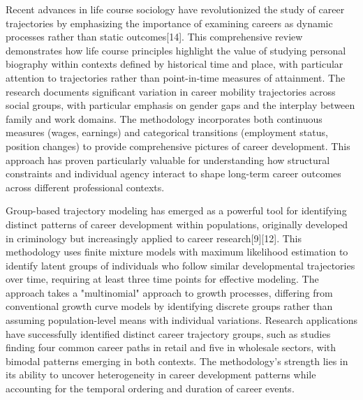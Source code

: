 \documentclass[main.tex]{subfiles}
\begin{document}

Recent advances in life course sociology have revolutionized the study of career trajectories by emphasizing the importance of examining careers as dynamic processes rather than static outcomes[14]. This comprehensive review demonstrates how life course principles highlight the value of studying personal biography within contexts defined by historical time and place, with particular attention to trajectories rather than point-in-time measures of attainment. The research documents significant variation in career mobility trajectories across social groups, with particular emphasis on gender gaps and the interplay between family and work domains. The methodology incorporates both continuous measures (wages, earnings) and categorical transitions (employment status, position changes) to provide comprehensive pictures of career development. This approach has proven particularly valuable for understanding how structural constraints and individual agency interact to shape long-term career outcomes across different professional contexts.


Group-based trajectory modeling has emerged as a powerful tool for identifying distinct patterns of career development within populations, originally developed in criminology but increasingly applied to career research[9][12]. This methodology uses finite mixture models with maximum likelihood estimation to identify latent groups of individuals who follow similar developmental trajectories over time, requiring at least three time points for effective modeling. The approach takes a "multinomial" approach to growth processes, differing from conventional growth curve models by identifying discrete groups rather than assuming population-level means with individual variations. Research applications have successfully identified distinct career trajectory groups, such as studies finding four common career paths in retail and five in wholesale sectors, with bimodal patterns emerging in both contexts. The methodology's strength lies in its ability to uncover heterogeneity in career development patterns while accounting for the temporal ordering and duration of career events.

\end{document}
